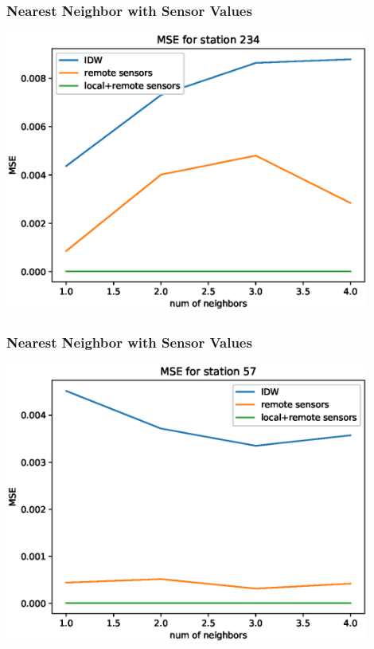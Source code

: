 \begin{frame}
\frametitle{Nearest Neighbor with Sensor Values \continued}
\centering
\includegraphics[width=0.9\textwidth]{images/234-idw-local-remote}
\end{frame}

\begin{frame}
\frametitle{Nearest Neighbor with Sensor Values \continued}
\centering
\includegraphics[width=0.9\textwidth]{images/57-idw-local-remote}
\end{frame}


